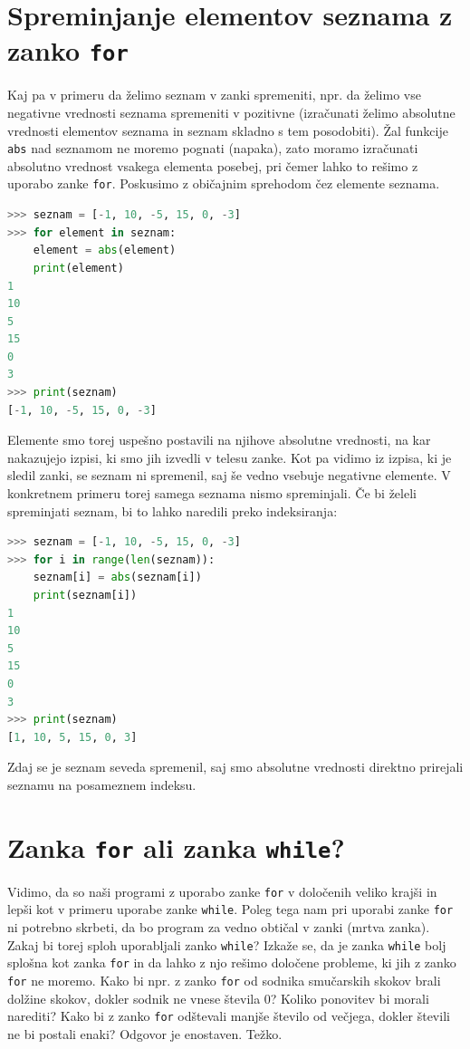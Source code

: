 \section{Spreminjanje elementov seznama z zanko \texttt{for}}
Kaj pa v primeru da želimo seznam v zanki spremeniti, npr. da želimo vse negativne vrednosti seznama spremeniti v pozitivne (izračunati želimo absolutne vrednosti elementov seznama in seznam skladno s tem posodobiti). Žal funkcije \texttt{abs} nad seznamom ne moremo pognati (napaka), zato moramo izračunati absolutno vrednost vsakega elementa posebej, pri čemer lahko to rešimo z uporabo zanke \texttt{for}. Poskusimo z običajnim sprehodom čez elemente seznama.
\begin{lstlisting}[language=Python]
>>> seznam = [-1, 10, -5, 15, 0, -3]
>>> for element in seznam:
	element = abs(element)
	print(element)
1
10
5
15
0
3
>>> print(seznam)
[-1, 10, -5, 15, 0, -3]
\end{lstlisting}
Elemente smo torej uspešno postavili na njihove absolutne vrednosti, na kar nakazujejo izpisi, ki smo jih izvedli v telesu zanke. Kot pa vidimo iz izpisa, ki je sledil zanki, se seznam ni spremenil, saj še vedno vsebuje negativne elemente. V konkretnem primeru torej samega seznama nismo spreminjali. Če bi želeli spreminjati seznam, bi to lahko naredili preko indeksiranja:
\begin{lstlisting}[language=Python]
>>> seznam = [-1, 10, -5, 15, 0, -3]
>>> for i in range(len(seznam)):
	seznam[i] = abs(seznam[i])
	print(seznam[i])
1
10
5
15
0
3
>>> print(seznam)
[1, 10, 5, 15, 0, 3]
\end{lstlisting}
Zdaj se je seznam seveda spremenil, saj smo absolutne vrednosti direktno prirejali seznamu na posameznem indeksu.

\section{Zanka \texttt{for} ali zanka \texttt{while}?}
Vidimo, da so naši programi z uporabo zanke \texttt{for} v določenih veliko krajši in lepši kot v primeru uporabe zanke \texttt{while}. Poleg tega nam pri uporabi zanke \texttt{for} ni potrebno skrbeti, da bo program za vedno obtičal v zanki (mrtva zanka). Zakaj bi torej sploh uporabljali zanko \texttt{while}? Izkaže se, da je zanka \texttt{while} bolj splošna kot zanka \texttt{for} in da lahko z njo rešimo določene probleme, ki jih z zanko \texttt{for} ne moremo. Kako bi npr. z zanko \texttt{for} od sodnika smučarskih skokov brali dolžine skokov, dokler sodnik ne vnese števila 0? Koliko ponovitev bi morali narediti? Kako bi z zanko \texttt{for} odštevali manjše število od večjega, dokler števili ne bi postali enaki? Odgovor je enostaven. Težko.

